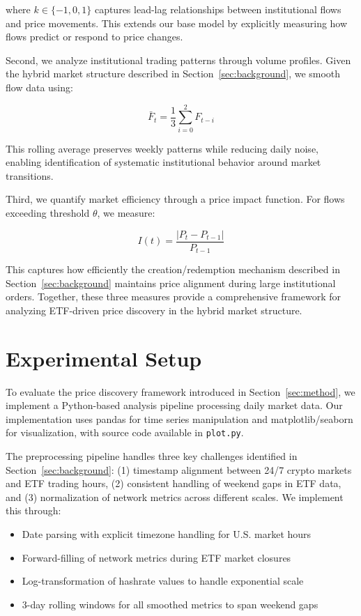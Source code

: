 \documentclass{article} %
\begin{document}
where $k \in \{-1,0,1\}$ captures lead-lag relationships between institutional flows and price movements. This extends our base model by explicitly measuring how flows predict or respond to price changes.

Second, we analyze institutional trading patterns through volume profiles. Given the hybrid market structure described in Section~\ref{sec:background}, we smooth flow data using:

\begin{equation}
    \bar{F}_t = \frac{1}{3}\sum_{i=0}^{2} F_{t-i}
\end{equation}

This rolling average preserves weekly patterns while reducing daily noise, enabling identification of systematic institutional behavior around market transitions.

Third, we quantify market efficiency through a price impact function. For flows exceeding threshold $\theta$, we measure:

\begin{equation}
    I(t) = \frac{|P_t - P_{t-1}|}{P_{t-1}}
\end{equation}

This captures how efficiently the creation/redemption mechanism described in Section~\ref{sec:background} maintains price alignment during large institutional orders. Together, these three measures provide a comprehensive framework for analyzing ETF-driven price discovery in the hybrid market structure.

\section{Experimental Setup}
\label{sec:experimental}

To evaluate the price discovery framework introduced in Section~\ref{sec:method}, we implement a Python-based analysis pipeline processing daily market data. Our implementation uses pandas for time series manipulation and matplotlib/seaborn for visualization, with source code available in \texttt{plot.py}.

The preprocessing pipeline handles three key challenges identified in Section~\ref{sec:background}: (1) timestamp alignment between 24/7 crypto markets and ETF trading hours, (2) consistent handling of weekend gaps in ETF data, and (3) normalization of network metrics across different scales. We implement this through:

\begin{itemize}
    \item Date parsing with explicit timezone handling for U.S. market hours
    \item Forward-filling of network metrics during ETF market closures
    \item Log-transformation of hashrate values to handle exponential scale
    \item 3-day rolling windows for all smoothed metrics to span weekend gaps
\end{itemize}
\end{document}
